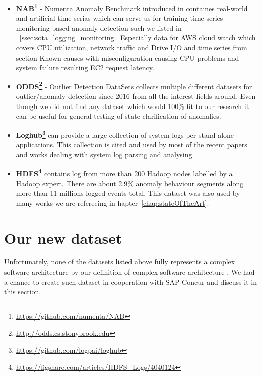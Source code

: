\begin{itemize}

    \item \textbf{NAB\footnote{\url{https://github.com/numenta/NAB}}} - Numenta Anomaly Benchmark introduced in \cite{ahmad2017unsupervised} containes real-world and artificial time serias which can serve us for training time series monitoring based anomaly detection such we listed in ~\ref{ssec:sota_logging_monitoring}. Especially data for AWS cloud watch which covers CPU utilization, network traffic and Drive I/O and time series from section Known causes with misconfiguration causing CPU problems and system failure resulting EC2 request latency.
    
    \item \textbf{ODDS\footnote{\url{http://odds.cs.stonybrook.edu}}} - Outlier Detection DataSets collects multiple different datasets for outlier/anomaly detection since 2016 from all the interest fields around. Even though we did not find any dataset which would 100\% fit to our research it can be useful for general testing of state clarification of anomalies. 
    
    \item \textbf{Loghub\footnote{\url{https://github.com/logpai/loghub}}} can provide a large collection of system logs per stand alone applications. This collection is cited and used by most of the recent papers and works dealing with system log parsing and analysing.

   \item \textbf{HDFS\footnote{\url{https://figshare.com/articles/HDFS_Logs/4040124}} \cite{xu2009detecting,xu2009online,Zhu2017}} contains log from more than 200 Hadoop nodes labelled by a Hadoop expert. There are about 2.9\% anomaly behaviour segments along more than 11 millions logged events total. This dataset was also used by many works we are refereeing in hapter~\ref{chap:stateOfTheArt}.
    
\end{itemize}

\section{Our new dataset}

Unfortunately, none of the datasets listed above fully represents a complex software architecture by our definition of complex software architecture . We had a chance to create such dataset in cooperation with SAP Concur and discuss it in this section.

